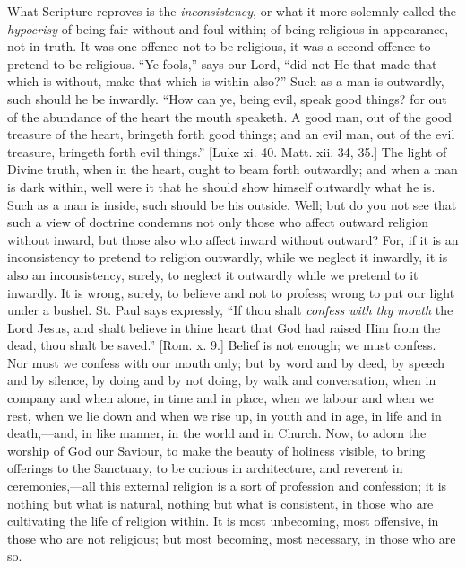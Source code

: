 What Scripture reproves is the \emph{inconsistency}, or what it
more solemnly called the \emph{hypocrisy} of being fair without and
foul within; of being religious in appearance, not in truth. It was
one offence not to be religious, it was a second offence to pretend to
be religious. ``Ye fools,'' says our Lord, ``did not He
that made that which is without, make that which is within also?''
Such as a man is outwardly, such should he be inwardly. ``How can
ye, being evil, speak good things? for out of the abundance of the
heart the mouth speaketh. A good man, out of the good treasure of the
heart, bringeth forth good things; and an evil man, out of the evil
treasure, bringeth forth evil things.'' [Luke xi. 40. Matt. xii.
34, 35.] The light of Divine truth, when in the heart, ought to beam
forth outwardly; and when a man is dark within, well were it that he
should show himself outwardly what he is. Such as a man is inside,
such should be his outside. Well; but do you not see that such a view
of doctrine condemns not only those who affect outward religion
without inward, but those also who affect inward without outward? For,
if it is an inconsistency to pretend to religion outwardly, while we
neglect it inwardly, it is also an inconsistency, surely, to neglect
it outwardly while we pretend to it inwardly. It is wrong, surely, to
believe and not to profess; wrong to put our light under a bushel. St.
Paul says expressly, ``If thou shalt \emph{confess with thy mouth}
the Lord Jesus, and shalt believe in thine heart that God had raised
Him from the dead, thou shalt be saved.'' [Rom. x. 9.] Belief is
not enough; we must confess. Nor must we confess with our mouth only;
but by word and by deed, by speech and by silence, by doing and by not
doing, by walk and conversation, when in company and when alone, in
time and in place, when we labour and when we rest, when we lie down
and when we rise up, in youth and in age, in life and in death,—and,
in like manner, in the world and in Church. Now, to adorn the worship
of God our Saviour, to make the beauty of holiness visible, to bring
offerings to the Sanctuary, to be curious in architecture, and
reverent in ceremonies,—all this external religion is a sort of
profession and confession; it is nothing but what is natural, nothing
but what is consistent, in those who are cultivating the life of
religion within. It is most unbecoming, most offensive, in those who
are not religious; but most becoming, most necessary, in those who are
so.

